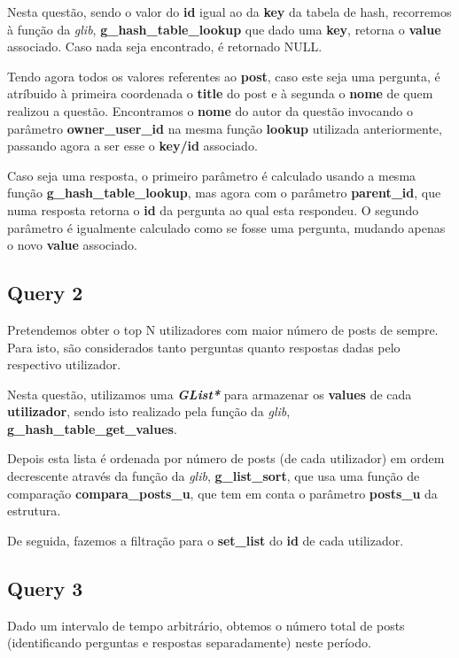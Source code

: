 \documentclass[a4paper]{article}
\begin{document}
Nesta questão, sendo o valor do \textbf{id} igual ao da \textbf{key} 
da tabela de hash, recorremos à função da \textit{glib},
\textbf{g\_hash\_table\_lookup} que dado uma \textbf{key},
retorna o \textbf{value} associado. Caso nada seja encontrado,
é retornado NULL.

Tendo agora todos os valores referentes ao \textbf{post}, caso este
seja uma pergunta, é atríbuido à primeira coordenada o \textbf{title}
do post e à segunda o \textbf{nome} de quem realizou a questão.
Encontramos o \textbf{nome} do autor da questão invocando o parâmetro
\textbf{owner\_user\_id} na mesma função \textbf{lookup} utilizada 
anteriormente, passando agora a ser esse o \textbf{key/id} associado.

Caso seja uma resposta, o primeiro parâmetro é calculado usando a mesma 
função \textbf{g\_hash\_table\_lookup}, mas agora com o 
parâmetro \textbf{parent\_id}, que numa resposta retorna o \textbf{id} 
da pergunta ao qual esta respondeu. O segundo parâmetro é igualmente
calculado como se fosse uma pergunta, mudando apenas o novo 
\textbf{value} associado.

\subsection{Query 2}

Pretendemos obter o top N utilizadores com maior número de posts de 
sempre. Para isto, são considerados tanto perguntas quanto respostas 
dadas pelo respectivo utilizador.

Nesta questão, utilizamos uma \textit{\textbf{GList*}} para armazenar 
os \textbf{values} de cada \textbf{utilizador}, sendo isto realizado
pela função da \textit{glib}, \textbf{g\_hash\_table\_get\_values}.

Depois esta lista é ordenada por número de posts (de cada utilizador)
em ordem decrescente através da função da \textit{glib}, 
\textbf{g\_list\_sort}, que usa uma função de comparação 
\textbf{compara\_posts\_u}, que tem em conta o parâmetro
\textbf{posts\_u} da estrutura.

De seguida, fazemos a filtração para o \textbf{set\_list} do 
\textbf{id} de cada utilizador.

\subsection{Query 3}

Dado um intervalo de tempo arbitrário, obtemos o número total de posts 
(identificando perguntas e respostas separadamente) neste período.
\end{document}

